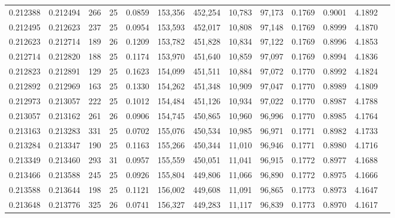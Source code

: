 \begin{tabular}{rrrrrrrrrrrrr}
0.212388 & 0.212494 &   266 &  25 &                                     0.0859 & 153,356 & 452,254 &  10,783 &  97,173 & 0.1769 & 0.9001 & 4.1892 \\
0.212495 & 0.212623 &   237 &  25 &                                     0.0954 & 153,593 & 452,017 &  10,808 &  97,148 & 0.1769 & 0.8999 & 4.1870 \\
0.212623 & 0.212714 &   189 &  26 &                                     0.1209 & 153,782 & 451,828 &  10,834 &  97,122 & 0.1769 & 0.8996 & 4.1853 \\
0.212714 & 0.212820 &   188 &  25 &                                     0.1174 & 153,970 & 451,640 &  10,859 &  97,097 & 0.1769 & 0.8994 & 4.1836 \\
0.212823 & 0.212891 &   129 &  25 &                                     0.1623 & 154,099 & 451,511 &  10,884 &  97,072 & 0.1770 & 0.8992 & 4.1824 \\
0.212892 & 0.212969 &   163 &  25 &                                     0.1330 & 154,262 & 451,348 &  10,909 &  97,047 & 0.1770 & 0.8989 & 4.1809 \\
0.212973 & 0.213057 &   222 &  25 &                                     0.1012 & 154,484 & 451,126 &  10,934 &  97,022 & 0.1770 & 0.8987 & 4.1788 \\
0.213057 & 0.213162 &   261 &  26 &                                     0.0906 & 154,745 & 450,865 &  10,960 &  96,996 & 0.1770 & 0.8985 & 4.1764 \\
0.213163 & 0.213283 &   331 &  25 &                                     0.0702 & 155,076 & 450,534 &  10,985 &  96,971 & 0.1771 & 0.8982 & 4.1733 \\
0.213284 & 0.213347 &   190 &  25 &                                     0.1163 & 155,266 & 450,344 &  11,010 &  96,946 & 0.1771 & 0.8980 & 4.1716 \\
0.213349 & 0.213460 &   293 &  31 &                                     0.0957 & 155,559 & 450,051 &  11,041 &  96,915 & 0.1772 & 0.8977 & 4.1688 \\
0.213466 & 0.213588 &   245 &  25 &                                     0.0926 & 155,804 & 449,806 &  11,066 &  96,890 & 0.1772 & 0.8975 & 4.1666 \\
0.213588 & 0.213644 &   198 &  25 &                                     0.1121 & 156,002 & 449,608 &  11,091 &  96,865 & 0.1773 & 0.8973 & 4.1647 \\
0.213648 & 0.213776 &   325 &  26 &                                     0.0741 & 156,327 & 449,283 &  11,117 &  96,839 & 0.1773 & 0.8970 & 4.1617 \\

\end{tabular}
